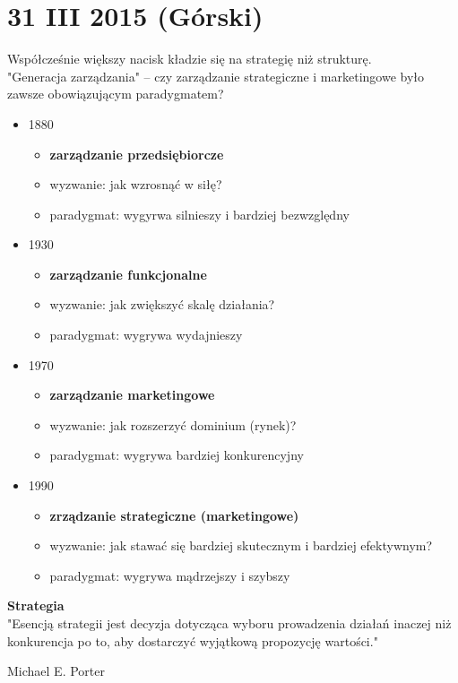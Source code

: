 \documentclass[a4paper,10pt]{report}
\begin{document}
\section{31 III 2015 (Górski)}

Współcześnie większy nacisk kładzie się na strategię niż strukturę. \\

"Generacja zarządzania" -- czy zarządzanie strategiczne i marketingowe było zawsze obowiązującym paradygmatem?

\begin{itemize}
	\item 1880
	\begin{itemize}
		\item \textbf{zarządzanie przedsiębiorcze}
		\item wyzwanie: jak wzrosnąć w siłę?
		\item paradygmat: wygyrwa silnieszy i bardziej bezwzględny
	\end{itemize}
	\item 1930
	\begin{itemize}
		\item \textbf{zarządzanie funkcjonalne}
		\item wyzwanie: jak zwiększyć skalę działania?
		\item paradygmat: wygrywa wydajnieszy
	\end{itemize}
	\item 1970
	\begin{itemize}
		\item \textbf{zarządzanie marketingowe}
		\item wyzwanie: jak rozszerzyć dominium (rynek)?
		\item paradygmat: wygrywa bardziej konkurencyjny
	\end{itemize}
	\item 1990
	\begin{itemize}
		\item \textbf{zrządzanie strategiczne (marketingowe)}
		\item wyzwanie: jak stawać się bardziej skutecznym i bardziej efektywnym?
		\item paradygmat: wygrywa mądrzejszy i szybszy
	\end{itemize}
\end{itemize}

\textbf{Strategia}\\
"Esencją strategii jest decyzja dotycząca wyboru prowadzenia działań inaczej niż konkurencja po to, aby dostarczyć wyjątkową propozycję wartości." 
\begin{flushright}
	Michael E. Porter
\end{flushright}
\end{document}
